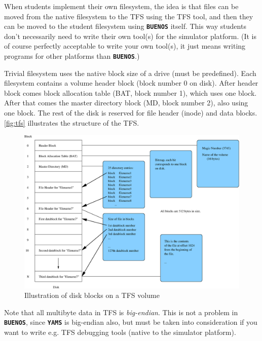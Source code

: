 \documentclass[twoside,a4paper]{report}
\newlength{\tablewidth}
\newcommand{\buenos}{\texttt{\textbf{BUENOS}}}
\newcommand{\yams}{\texttt{\textbf{YAMS}}}
\begin{document}
When students implement their own filesystem, the idea is that files
can be moved from the native filesystem to the TFS using the TFS
tool, and then they can be moved to the student filesystem using
\buenos{} itself. This way students don't necessarily need to write
their own tool(s) for the simulator platform. (It is of course perfectly
acceptable to write your own tool(s), it just means writing programs for
other platforms than \buenos{}.)

Trivial filesystem uses the native block size of a drive (must be
predefined). Each filesystem contains a volume header block (block
number 0 on disk). After header block comes block allocation table
(BAT, block number 1), which uses one block. After that comes the
master directory block (MD, block number 2), also using one block. The
rest of the disk is reserved for file header (inode) and data
blocks. \autoref{fig:tfs} illustrates the structure of the TFS.


\begin{figure}
\begin{center}
\includegraphics[width=\tablewidth,angle=0]{pics/tfs.eps}
\caption{Illustration of disk blocks on a TFS volume}
\label{fig:tfs}
\end{center}
\end{figure}

Note that all multibyte data in TFS is \emph{big-endian}. This is not
a problem in \buenos{}, since \yams{} is big-endian also, but must be
taken into consideration if you want to write e.g. TFS debugging tools
(native to the simulator platform).
\end{document}
